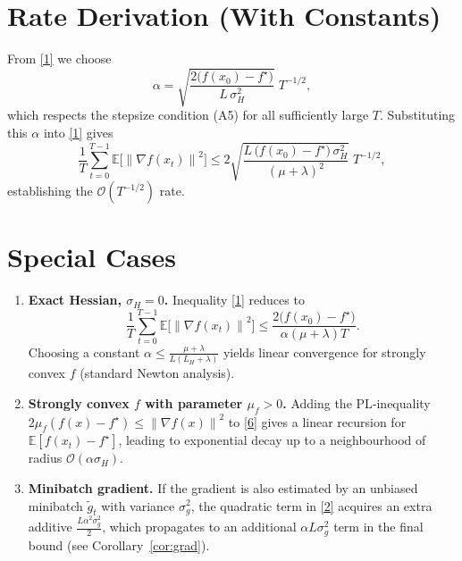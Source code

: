 \documentclass{article}
\newcommand{\E}{\mathbb{E}}
\newcommand{\norm}[1]{\left\lVert #1 \right\rVert}
\begin{document}
\section*{Rate Derivation (With Constants)}
From \eqref{1} we choose
\[
\alpha = \sqrt{\frac{2\bigl(f(x_{0})-f^{\star}\bigr)}{L\,\sigma_{H}^{2}}}\;T^{-1/2},
\]
which respects the stepsize condition (A5) for all sufficiently large $T$.  Substituting this $\alpha$ into \eqref{1} gives
\[
\frac{1}{T}\sum_{t=0}^{T-1}\E\!\bigl[\norm{\nabla f(x_{t})}^{2}\bigr]
\le
2\sqrt{\frac{L\,\bigl(f(x_{0})-f^{\star}\bigr)\,\sigma_{H}^{2}}{(\mu+\lambda)^{2}}}\;T^{-1/2},
\]
establishing the $\mathcal{O}(T^{-1/2})$ rate.

\section*{Special Cases}\label{sec:special}
\begin{enumerate}
\item \textbf{Exact Hessian, $\sigma_{H}=0$.}  Inequality \eqref{1} reduces to
\[
\frac{1}{T}\sum_{t=0}^{T-1}\E\!\bigl[\norm{\nabla f(x_{t})}^{2}\bigr]
\le \frac{2\bigl(f(x_{0})-f^{\star}\bigr)}{\alpha(\mu+\lambda)T}.
\]
Choosing a constant $\alpha\le \frac{\mu+\lambda}{L(L_{H}+\lambda)}$ yields linear convergence for strongly convex $f$ (standard Newton analysis).

\item \textbf{Strongly convex $f$ with parameter $\mu_{f}>0$.}  Adding the PL‑inequality $2\mu_{f}(f(x)-f^{\star})\le \norm{\nabla f(x)}^{2}$ to \eqref{6} gives a linear recursion for $\E[f(x_{t})-f^{\star}]$, leading to exponential decay up to a neighbourhood of radius $\mathcal{O}(\alpha\sigma_{H})$.

\item \textbf{Minibatch gradient.}  If the gradient is also estimated by an unbiased minibatch $\tilde g_{t}$ with variance $\sigma_{g}^{2}$, the quadratic term in \eqref{2} acquires an extra additive $\frac{L\alpha^{2}\sigma_{g}^{2}}{2}$, which propagates to an additional $\alpha L\sigma_{g}^{2}$ term in the final bound (see Corollary~\ref{cor:grad}).
\end{enumerate}
\end{document}
